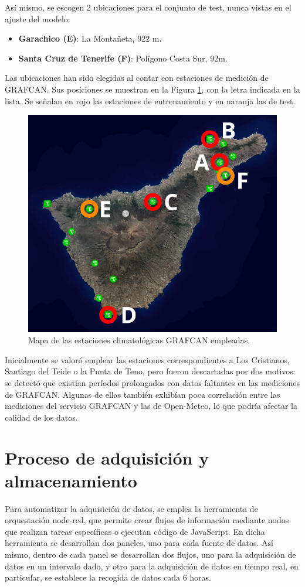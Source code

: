 Así mismo, se escogen 2 ubicaciones para el conjunto de test, nunca vistas en el ajuste del modelo:
\begin{itemize}
    \item \textbf{Garachico (E)}: La Montañeta, 922 m.
    \item \textbf{Santa Cruz de Tenerife (F)}: Polígono Costa Sur, 92m.
\end{itemize}

Las ubicaciones han sido elegidas al contar con estaciones de medición de GRAFCAN.
Sus posiciones se muestran en la Figura \ref{mapa_estaciones}, con la letra indicada en la lista.
Se señalan en rojo las estaciones de entrenamiento y en naranja las de test.

\begin{figure}[htb]
   \centering
   \includegraphics[width=0.6\linewidth]{images/mapa_estaciones}
   \caption{Mapa de las estaciones climatológicas GRAFCAN empleadas.}
   \label{mapa_estaciones}
\end{figure}

Inicialmente se valoró emplear las estaciones correspondientes a Los Cristianos, Santiago del Teide o la Punta de Teno, pero fueron descartadas por dos motivos: 
se detectó que existían períodos prolongados con datos faltantes en las mediciones de GRAFCAN. Algunas de ellas también exhibían poca correlación entre las mediciones
del servicio GRAFCAN y las de Open-Meteo, lo que podría afectar la calidad de los datos.

\bigskip

\section{Proceso de adquisición y almacenamiento}

Para automatizar la adquisición de datos, se emplea la herramienta de orquestación node-red, que permite crear flujos de información mediante nodos que realizan tareas específicas o ejecutan código de JavaScript.
En dicha herramienta se desarrollan dos paneles, uno para cada fuente de datos. 
Así mismo, dentro de cada panel se desarrollan dos flujos, uno para la adquisición de datos en un intervalo dado, y otro para la adquisición de datos en tiempo real, en particular, 
se establece la recogida de datos cada 6 horas.


